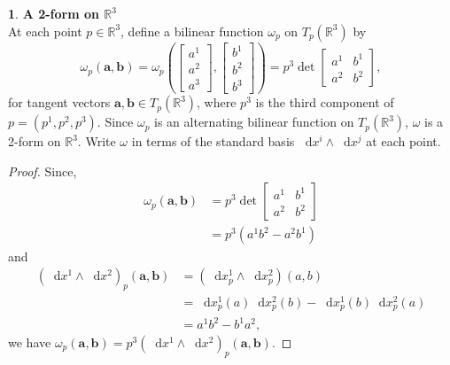 \documentclass[12pt]{article}
\newcommand{\dd}{\mathop{}\!\mathrm{d}}
\theoremstyle{definition}
\newtheorem{ex}{}[section]
\begin{document}
\begin{ex}
	\textbf{A 2-form on $\mathbb{R}^3$} \\
	At each point $p \in \mathbb{R}^3$, define a bilinear function $\omega_p$ on $T_p(\mathbb{R}^3)$ by \begin{equation*}
		\omega_p(\mathbf{a}, \mathbf{b}) = \omega_p \left( \begin{bmatrix}a^1 \\ a^2 \\ a^3\end{bmatrix}, \begin{bmatrix}b^1 \\ b^2 \\ b^3\end{bmatrix} \right) = p^3 \det \begin{bmatrix}a^1 & b^1 \\ a^2 & b^2\end{bmatrix},
	\end{equation*}
	for tangent vectors $\mathbf{a}, \mathbf{b} \in T_p(\mathbb{R}^3)$, where $p^3$ is the third component of $p = (p^1, p^2, p^3)$.
	Since $\omega_p$ is an alternating bilinear function on $T_p(\mathbb{R}^3)$, $\omega$ is a 2-form on $\mathbb{R}^3$.
	Write $\omega$ in terms of the standard basis $\dd x^i \wedge \dd x^j$ at each point.
\end{ex}
\begin{proof}
	Since, \begin{align*}
		\omega_p(\mathbf{a}, \mathbf{b}) & = p^3 \det \begin{bmatrix} a^1 & b^1 \\ a^2 & b^2 \end{bmatrix} \\
		                                 & = p^3 (a^1b^2 - a^2b^1)
	\end{align*}
	and \begin{align*}
		(\dd x^1 \wedge \dd x^2)_p(\mathbf{a}, \mathbf{b}) & = (\dd x^1_p \wedge \dd x^2_p)(a, b)                  \\
		                                                   & = \dd x^1_p(a)\dd x^2_p(b) - \dd x^1_p(b)\dd x^2_p(a) \\
		                                                   & = a^1b^2 - b^1a^2,
	\end{align*}
	we have $\omega_p(\mathbf{a}, \mathbf{b}) = p^3(\dd x^1 \wedge \dd x^2)_p(\mathbf{a}, \mathbf{b})$.
\end{proof}
\end{document}
